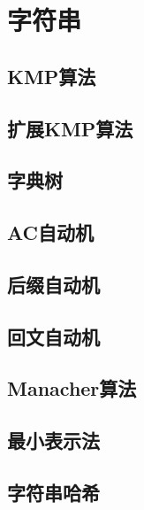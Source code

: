 \documentclass[twocolumn,a4]{article}  %
\begin{document}
	\section{字符串}
		\subsection{KMP算法}
	 	 	
	 	
		\subsection{扩展KMP算法}
	 	 	
	
	 	 \subsection{字典树}
	 	 	
	 	 	
		\subsection{AC自动机}
	 	 	
	 	 	
		\subsection{后缀自动机}
	 	 		
	 	 	
		\subsection{回文自动机}
	 	 		
	 	 	
		\subsection{Manacher算法}
	 	 		
	 	 	
		\subsection{最小表示法}
	 	 		
	 	 	
		\subsection{字符串哈希}
			
	 	 	
\end{document}
